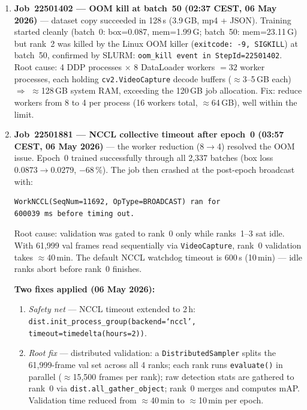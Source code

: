 \begin{enumerate}
    \item \textbf{Job~22501402 — OOM kill at batch~50
          (02:37 CEST, 06 May 2026)} — dataset copy succeeded in
          128\,s (3.9\,GB, mp4 + JSON). Training started cleanly
          (batch~0: box=0.087, mem=1.99\,G; batch~50: mem=23.11\,G)
          but rank~2 was killed by the Linux OOM killer
          (\texttt{exitcode: -9, SIGKILL}) at batch~50, confirmed
          by SLURM: \texttt{oom\_kill event in StepId=22501402}.
          Root cause: 4 DDP processes $\times$ 8 DataLoader workers
          $= 32$ worker processes, each holding \texttt{cv2.VideoCapture}
          decode buffers ($\approx$3--5\,GB each) $\Rightarrow$
          $\approx$128\,GB system RAM, exceeding the 120\,GB job
          allocation. Fix: reduce workers from 8 to 4 per process
          (16 workers total, $\approx$64\,GB), well within the limit.

    \item \textbf{Job~22501881 — NCCL collective timeout after epoch~0
          (03:57 CEST, 06 May 2026)} — the worker reduction (8$\to$4)
          resolved the OOM issue. Epoch~0 trained successfully through
          all 2,337 batches (box loss $0.0873\to0.0279$, $-68\,\%$).
          The job then crashed at the post-epoch broadcast with:
\begin{verbatim}
WorkNCCL(SeqNum=11692, OpType=BROADCAST) ran for
600039 ms before timing out.
\end{verbatim}
          Root cause: validation was gated to rank~0 only while ranks~1--3
          sat idle. With 61,999 val frames read sequentially via
          \texttt{VideoCapture}, rank~0 validation takes $\approx$40\,min.
          The default NCCL watchdog timeout is 600\,s (10\,min) —
          idle ranks abort before rank~0 finishes.

          \textbf{Two fixes applied (06 May 2026):}
          \begin{enumerate}
              \item \textit{Safety net} — NCCL timeout extended to 2\,h:
                    \texttt{dist.init\_process\_group(backend=`nccl',
                    timeout=timedelta(hours=2))}.
              \item \textit{Root fix} — distributed validation: a
                    \texttt{DistributedSampler} splits the 61,999-frame val
                    set across all 4 ranks; each rank runs
                    \texttt{evaluate()} in parallel ($\approx$15,500 frames
                    per rank); raw detection stats are gathered to rank~0
                    via \texttt{dist.all\_gather\_object}; rank~0 merges
                    and computes mAP. Validation time reduced from
                    $\approx$40\,min to $\approx$10\,min per epoch.
          \end{enumerate}


\end{enumerate}
